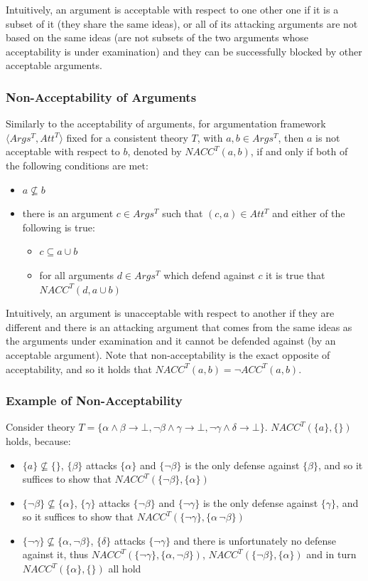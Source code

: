 \documentclass[11pt,twoside,a4paper]{report}
\begin{document}
Intuitively, an argument is acceptable with respect to one other one if it is a subset of it (they share the same ideas), or all of its attacking arguments are not based on the same ideas (are not subsets of the two arguments whose acceptability is under examination) and they can be successfully blocked by other acceptable arguments.

\subsubsection{Non-Acceptability of Arguments}
\label{subsec:nacc}
Similarly to the acceptability of arguments, for argumentation framework $\langle Args^T, Att^T\rangle$ fixed for a consistent theory $T$, with $a,b\in Args^T$, then $a$ is not acceptable with respect to $b$, denoted by $NACC^T(a,b)$, if and only if both of the following conditions are met:
\begin{itemize}
\item
$a\nsubseteq b$
\item
there is an argument $c\in Args^T$ such that $(c,a)\in Att^T$ and either of the following is true:
\begin{itemize}
\item
$c\subseteq a\cup b$
\item
for all arguments $d\in Args^T$ which defend against $c$ it is true that $NACC^T(d,a\cup b)$
\end{itemize}
\end{itemize}

Intuitively, an argument is unacceptable with respect to another if they are different and there is an attacking argument that comes from the same ideas as the arguments under examination and it cannot be defended against (by an acceptable argument). Note that non-acceptability is the exact opposite of acceptability, and so it holds that $NACC^T(a,b) = \neg ACC^T(a,b)$.

\subsubsection{Example of Non-Acceptability}
Consider theory $T = \{\alpha\wedge\beta\rightarrow\bot, \neg\beta\wedge\gamma\rightarrow\bot, \neg\gamma\wedge\delta\rightarrow\bot\}$. $NACC^T(\{a\},\{\})$ holds, because:
\begin{itemize}
\item
$\{a\}\nsubseteq\{\}$, $\{\beta\}$ attacks $\{\alpha\}$ and $\{\neg\beta\}$ is the only defense against $\{\beta\}$, and so it suffices to show that $NACC^T(\{\neg\beta\}, \{\alpha\})$
\item
$\{\neg\beta\}\nsubseteq\{\alpha\}$, $\{\gamma\}$ attacks $\{\neg\beta\}$ and $\{\neg\gamma\}$ is the only defense against $\{\gamma\}$, and so it suffices to show that $NACC^T(\{\neg\gamma\}, \{\alpha\, \neg\beta\})$
\item
$\{\neg\gamma\}\nsubseteq\{\alpha, \neg\beta\}$, $\{\delta\}$ attacks $\{\neg\gamma\}$ and there is unfortunately no defense against it, thus $NACC^T(\{\neg\gamma\}, \{\alpha,\neg\beta\})$, $NACC^T(\{\neg\beta\}, \{\alpha\})$ and in turn $NACC^T(\{\alpha\}, \{\})$ all hold
\end{itemize}
\end{document}
